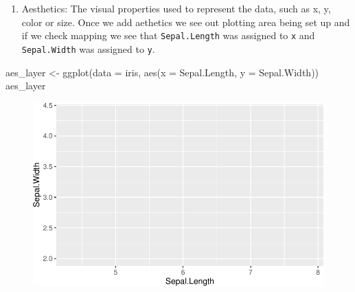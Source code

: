 \documentclass[
  letterpaper,
]{book}
\newenvironment{Shaded}{\begin{snugshade}}{\end{snugshade}}
\newcommand{\AttributeTok}[1]{\textcolor[rgb]{0.40,0.45,0.13}{#1}}
\newcommand{\FunctionTok}[1]{\textcolor[rgb]{0.28,0.35,0.67}{#1}}
\newcommand{\NormalTok}[1]{\textcolor[rgb]{0.00,0.23,0.31}{#1}}
\newcommand{\OtherTok}[1]{\textcolor[rgb]{0.00,0.23,0.31}{#1}}
\newcommand{\SpecialCharTok}[1]{\textcolor[rgb]{0.37,0.37,0.37}{#1}}
\providecommand{\tightlist}{%
  \setlength{\itemsep}{0pt}\setlength{\parskip}{0pt}}\usepackage{longtable,booktabs,array}
\begin{document}
\begin{enumerate}
\def\labelenumi{\arabic{enumi}.}
\setcounter{enumi}{1}
\tightlist
\item
  Aesthetics: The visual properties used to represent the data, such as
  x, y, color or size. Once we add aethetics we see out plotting area
  being set up and if we check mapping we see that \texttt{Sepal.Length}
  was assigned to \texttt{x} and \texttt{Sepal.Width} was assigned to
  \texttt{y}.
\end{enumerate}

\begin{Shaded}
\begin{Highlighting}[]
\NormalTok{aes\_layer }\OtherTok{\textless{}{-}} \FunctionTok{ggplot}\NormalTok{(}\AttributeTok{data =}\NormalTok{ iris, }
                    \FunctionTok{aes}\NormalTok{(}\AttributeTok{x =}\NormalTok{ Sepal.Length, }\AttributeTok{y =}\NormalTok{ Sepal.Width)) }
\NormalTok{aes\_layer}
\end{Highlighting}
\end{Shaded}

\begin{figure}[H]

{\centering \includegraphics{./data_viz_files/figure-pdf/unnamed-chunk-7-1.pdf}

}

\end{figure}

\begin{Shaded}
\end{Shaded}
\end{document}

